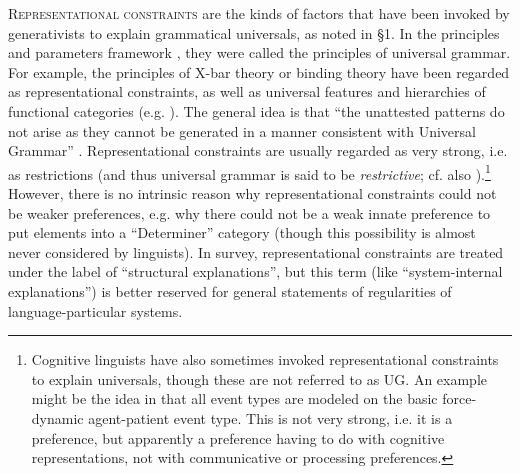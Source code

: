 \documentclass[output=paper]{langsci/langscibook}
\begin{document}
\textsc{Representational constraints} are the kinds of factors that have been invoked by generativists to explain grammatical universals, as noted in §1. In the principles and parameters framework \citep{Chomsky1981}, they were called the principles of universal grammar. For example, the principles of X-bar theory or binding theory have been regarded as representational constraints, as well as universal features and hierarchies of functional categories (e.g. \citealt{Cinque1999}). The general idea is that “the unattested patterns do not arise as they cannot be generated in a manner consistent with Universal Grammar” \citep{SmithEtAl2018}. Representational constraints are usually regarded as very strong, i.e. as restrictions (and thus universal grammar is said to be \textit{restrictive}; cf. also \citealt{Haspelmath2014}).\footnote{Cognitive linguists have also sometimes invoked representational constraints to explain universals, though these are not referred to as UG. An example might be the idea in \citet{Croft1991} that all event types are modeled on the basic force-dynamic agent-patient event type. This is not very strong, i.e. it is a preference, but apparently a preference having to do with cognitive representations, not with communicative or processing preferences.} However, there is no intrinsic reason why representational constraints could not be weaker preferences, e.g. why there could not be a weak innate preference to put elements into a “Determiner” category (though this possibility is almost never considered by linguists). In  survey, representational constraints are treated under the label of “structural explanations”, but this term (like “system-internal explanations”) is better reserved for general statements of regularities of language-particular systems.
\end{document}
